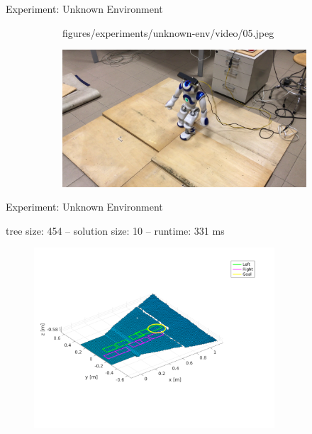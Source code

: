 \documentclass[10pt]{beamer}
\begin{document}
\begin{frame}{Experiment: Unknown Environment}
\begin{figure}
\begin{subfigure}{0.40\textwidth}
				{figures/experiments/unknown-env/video/05.jpeg}
		\end{subfigure}\hspace{0.05cm}%
		\begin{subfigure}{0.40\textwidth}
			\includegraphics[width=\linewidth]
				{figures/experiments/unknown-env/video/06.jpeg}
		\end{subfigure}
	\end{figure}
\end{frame}

\begin{frame}{Experiment: Unknown Environment}
	\begin{center}
    tree size: 454 -- solution size: 10 -- runtime: 331 ms
  \end{center}
	\begin{figure}
		\centering
		\includegraphics[width=0.8\textwidth]
				{figures/experiments/unknown-env/footstep-plan.pdf}
	\end{figure}
\end{frame}
\end{document}
